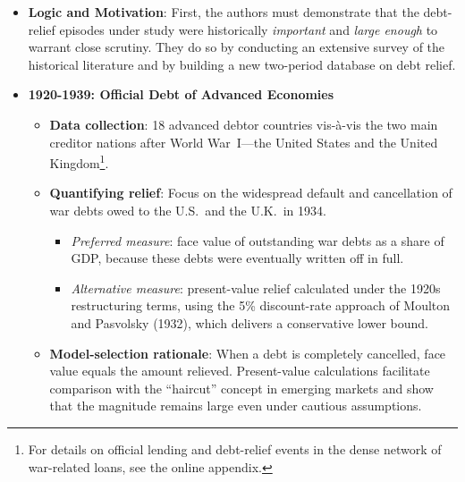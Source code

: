 \begin{itemize}
    \item \textbf{Logic and Motivation}:  
    First, the authors must demonstrate that the debt-relief episodes under study were historically \emph{important} and \emph{large enough} to warrant close scrutiny.  
    They do so by conducting an extensive survey of the historical literature and by building a new two-period database on debt relief.

    \item \textbf{1920-1939: Official Debt of Advanced Economies}%
        \begin{itemize}
            \item \textbf{Data collection}: 18 advanced debtor countries vis-à-vis the two main creditor nations after World War~I—the United States and the United Kingdom\footnote{For details on official lending and debt-relief events in the dense network of war-related loans, see the online appendix.}.
            \item \textbf{Quantifying relief}: Focus on the widespread default and cancellation of war debts owed to the U.S.\ and the U.K.\ in 1934.
                \begin{itemize}
                    \item \emph{Preferred measure}: face value of outstanding war debts as a share of GDP, because these debts were eventually written off in full.
                    \item \emph{Alternative measure}: present-value relief calculated under the 1920s restructuring terms, using the 5\% discount-rate approach of Moulton and Pasvolsky (1932), which delivers a conservative lower bound.
                \end{itemize}
            \item \textbf{Model-selection rationale}: When a debt is completely cancelled, face value equals the amount relieved. Present-value calculations facilitate comparison with the ``haircut'' concept in emerging markets and show that the magnitude remains large even under cautious assumptions.
        \end{itemize}


\end{itemize}
